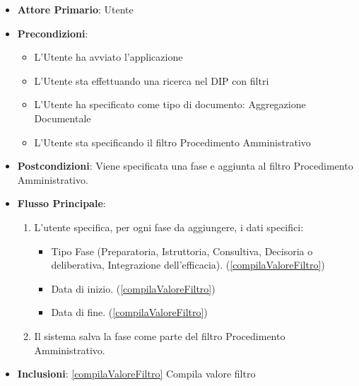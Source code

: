 \begin{itemize}
      \item \textbf{Attore Primario}: Utente
      \item \textbf{Precondizioni}: 
      \begin{itemize}
            \item L'Utente ha avviato l'applicazione
            \item L'Utente sta effettuando una ricerca nel DIP con filtri
            \item L'Utente ha specificato come tipo di documento: Aggregazione Documentale
            \item L'Utente sta specificando il filtro Procedimento Amministrativo
      \end{itemize}
      \item \textbf{Postcondizioni}: Viene specificata una fase e aggiunta al filtro Procedimento Amministrativo.
      \item \textbf{Flusso Principale}:
      \begin{enumerate}
            \item L'utente specifica, per ogni fase da aggiungere, i dati specifici:
            \begin{itemize}
                  \item Tipo Fase (Preparatoria, Istruttoria, Consultiva, Decisoria o deliberativa,
                  Integrazione dell'efficacia). (\ref{compilaValoreFiltro})
                  \item Data di inizio. (\ref{compilaValoreFiltro})
                  \item Data di fine. (\ref{compilaValoreFiltro})
            \end{itemize}
            \item Il sistema salva la fase come parte del filtro Procedimento Amministrativo.
      \end{enumerate}
      \item \textbf{Inclusioni}: \ref{compilaValoreFiltro} Compila valore filtro
\end{itemize}


